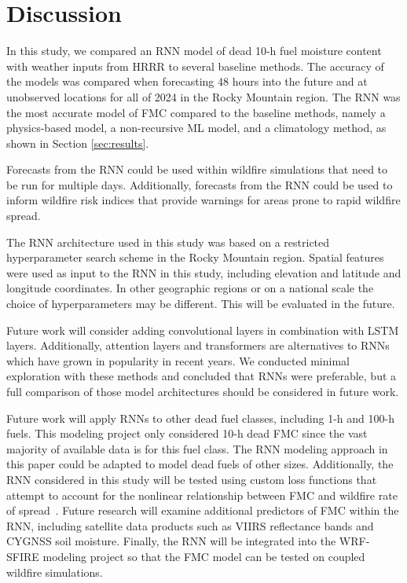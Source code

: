 \documentclass[fire,article,submit,pdftex,moreauthors]{Definitions/mdpi}
\begin{document}
\section{Discussion}

In this study, we compared an RNN model of dead 10-h fuel moisture content with weather inputs from HRRR to several baseline methods. The accuracy of the models was compared when forecasting 48 hours into the future and at unobserved locations for all of 2024 in the Rocky Mountain region. The RNN was the most accurate model of FMC compared to the baseline methods, namely a physics-based model, a non-recursive ML model, and a climatology method, as shown in Section \ref{sec:results}. 

Forecasts from the RNN could be used within wildfire simulations that need to be run for multiple days. Additionally, forecasts from the RNN could be used to inform wildfire risk indices that provide warnings for areas prone to rapid wildfire spread.

The RNN architecture used in this study was based on a restricted hyperparameter search scheme in the Rocky Mountain region. Spatial features were used as input to the RNN in this study, including elevation and latitude and longitude coordinates. In other geographic regions or on a national scale the choice of hyperparameters may be different. This will be evaluated in the future.

Future work will consider adding convolutional layers in combination with LSTM layers. Additionally, attention layers and transformers are alternatives to RNNs which have grown in popularity in recent years. We conducted minimal exploration with these methods and concluded that RNNs were preferable, but a full comparison of those model architectures should be considered in future work. 

Future work will apply RNNs to other dead fuel classes, including 1-h and 100-h fuels. This modeling project only considered 10-h dead FMC since the vast majority of available data is for this fuel class. The RNN modeling approach in this paper could be adapted to model dead fuels of other sizes. Additionally, the RNN considered in this study will be tested using custom loss functions that attempt to account for the nonlinear relationship between FMC and wildfire rate of spread~\citep{Hirschi-2025-CLF}. Future research will examine additional predictors of FMC within the RNN, including satellite data products such as VIIRS reflectance bands and CYGNSS soil moisture. Finally, the RNN will be integrated into the WRF-SFIRE modeling project so that the FMC model can be tested on coupled wildfire simulations.
\end{document}

